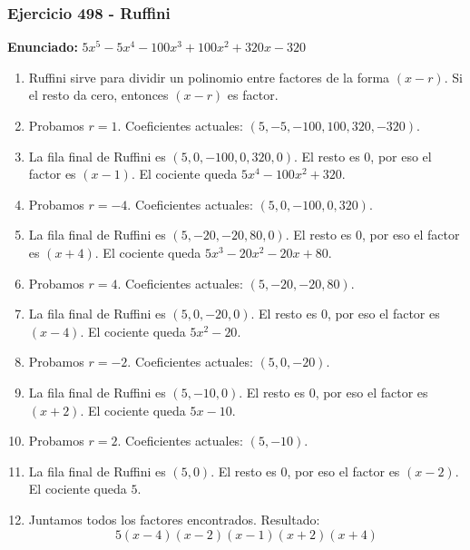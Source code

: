 \documentclass[11pt,a4paper]{article}
\begin{document}
\subsubsection*{Ejercicio 498 - Ruffini}
\textbf{Enunciado:} $ 5 x^{5} - 5 x^{4} - 100 x^{3} + 100 x^{2} + 320 x - 320 $\par
\begin{enumerate}[leftmargin=2em]
\item Ruffini sirve para dividir un polinomio entre factores de la forma \((x-r)\). Si el resto da cero, entonces \((x-r)\) es factor.
\item Probamos \(r=1\). Coeficientes actuales: \((5, -5, -100, 100, 320, -320)\).
\item La fila final de Ruffini es \((5, 0, -100, 0, 320, 0)\). El resto es \(0\), por eso el factor es \((x-1)\). El cociente queda \(5 x^{4} - 100 x^{2} + 320\).
\item Probamos \(r=-4\). Coeficientes actuales: \((5, 0, -100, 0, 320)\).
\item La fila final de Ruffini es \((5, -20, -20, 80, 0)\). El resto es \(0\), por eso el factor es \((x+4)\). El cociente queda \(5 x^{3} - 20 x^{2} - 20 x + 80\).
\item Probamos \(r=4\). Coeficientes actuales: \((5, -20, -20, 80)\).
\item La fila final de Ruffini es \((5, 0, -20, 0)\). El resto es \(0\), por eso el factor es \((x-4)\). El cociente queda \(5 x^{2} - 20\).
\item Probamos \(r=-2\). Coeficientes actuales: \((5, 0, -20)\).
\item La fila final de Ruffini es \((5, -10, 0)\). El resto es \(0\), por eso el factor es \((x+2)\). El cociente queda \(5 x - 10\).
\item Probamos \(r=2\). Coeficientes actuales: \((5, -10)\).
\item La fila final de Ruffini es \((5, 0)\). El resto es \(0\), por eso el factor es \((x-2)\). El cociente queda \(5\).
\item Juntamos todos los factores encontrados. Resultado: \[\boxed{5 \left(x - 4\right) \left(x - 2\right) \left(x - 1\right) \left(x + 2\right) \left(x + 4\right)}\]
\end{enumerate}

\vspace{0.2cm}
\end{document}
